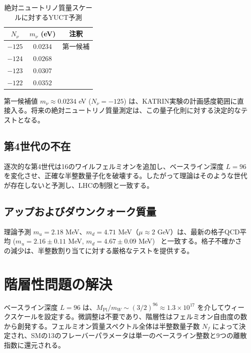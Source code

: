 \documentclass[12pt,a4paper]{article}
\begin{document}
	\begin{table}[htbp]
		\centering
		\caption{絶対ニュートリノ質量スケールに対するYUCT予測}
		\label{tab:neutrino}
		\begin{tabular}{c c c}
			\toprule
			\(N_\nu\) & \(m_\nu\) (eV) & 注釈 \\
			\midrule
			\(-125\) & \(0.0234\) & 第一候補 \\
			\(-124\) & \(0.0268\) & \\
			\(-123\) & \(0.0307\) & \\
			\(-122\) & \(0.0352\) & \\
			\bottomrule
		\end{tabular}
	\end{table}
	
	第一候補値 \(m_\nu \approx 0.0234\) eV (\(N_\nu = -125\)) は、KATRIN実験の計画感度範囲に直接入る。将来の絶対ニュートリノ質量測定は、この量子化則に対する決定的なテストとなる。
	
	\subsection{第4世代の不在}
	
	逐次的な第4世代は16のワイルフェルミオンを追加し、ベースライン深度 \(L=96\) を変化させ、正確な半整数量子化を破壊する。したがって理論はそのような世代が存在しないと予測し、LHCの制限と一致する。
	
	\subsection{アップおよびダウンクォーク質量}
	
	理論予測 \(m_u = 2.18\) MeV、\(m_d = 4.71\) MeV（\(\mu \approx 2\) GeV）は、最新の格子QCD平均 (\(m_u = 2.16 \pm 0.11\) MeV, \(m_d = 4.67 \pm 0.09\) MeV)~\cite{PDG2024} と一致する。格子不確かさの減少は、半整数割り当てに対する厳格なテストを提供する。
	
	\section{階層性問題の解決}
	
	ベースライン深度 \(L=96\) は、\(M_{\mathrm{Pl}}/m_W \sim (3/2)^{96} \approx 1.3\times10^{17}\) を介してウィークスケールを設定する。微調整は不要であり、階層性はフェルミオン自由度の数から創発する。フェルミオン質量スペクトル全体は半整数量子数 \(N_f\) によって決定され、SMの13のフレーバーパラメータは単一のベースライン整数と9つの離散指数に還元される。
	
\end{document}
